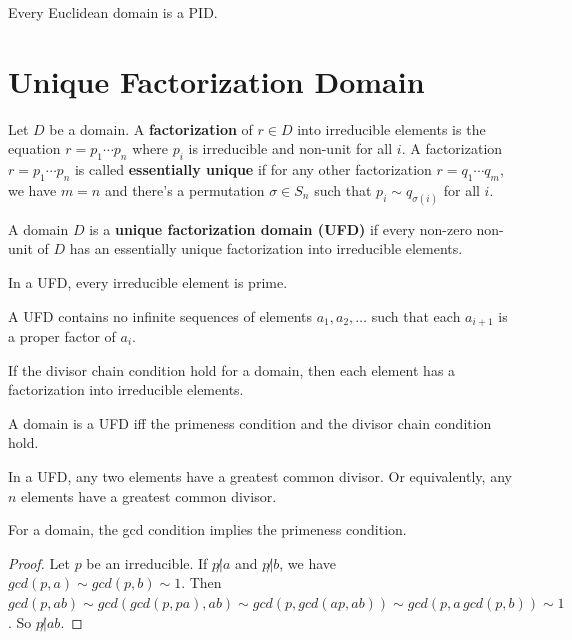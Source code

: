 \documentclass[12pt]{book}
\begin{document}
\begin{lemma}
	Every Euclidean domain is a PID.
\end{lemma}

\section{Unique Factorization Domain}

\begin{definition}
	Let $D$ be a domain. A {\bf factorization} of $r\in D$ into irreducible elements is the equation $r=p_1\cdots p_n$ where $p_i$ is irreducible and non-unit for all $i$. A factorization $r=p_1\cdots p_n$ is called {\bf essentially unique} if for any other factorization $r=q_1\cdots q_m$, we have $m=n$ and there's a permutation $\sigma\in S_n$ such that $p_i\sim q_{\sigma(i)}$ for all $i$.
\end{definition}

\begin{definition}
	A domain $D$ is a {\bf unique factorization domain (UFD)} if every non-zero non-unit of $D$ has an essentially unique factorization into irreducible elements.
\end{definition}

\begin{lemma} 
	In a UFD, every irreducible element is prime.
\end{lemma}

\begin{lemma} 
	A UFD contains no infinite sequences of elements $a_1,a_2,\dots$ such that each $a_{i+1}$ is a proper factor of $a_i$.
\end{lemma}

\begin{lemma}
	If the divisor chain condition hold for a domain, then each element has a factorization into irreducible elements.
\end{lemma}

\begin{lemma}
	A domain is a UFD iff the primeness condition and the divisor chain condition hold.
\end{lemma}

\begin{lemma} 
	In a UFD, any two elements have a greatest common divisor. Or equivalently, any $n$ elements have a greatest common divisor.
\end{lemma}

\begin{lemma}
	For a domain, the gcd condition implies the primeness condition.
\end{lemma}
\begin{proof}
	Let $p$ be an irreducible. If $p\not|a$ and $p\not|b$, we have $gcd(p,a)\sim gcd(p,b)\sim 1$. Then $gcd(p,ab)\sim gcd(gcd(p,pa),ab)\sim gcd(p,gcd(ap,ab))\sim gcd(p,a\, gcd(p,b))\sim 1$. So $p\not|ab$.
\end{proof}
\end{document}
